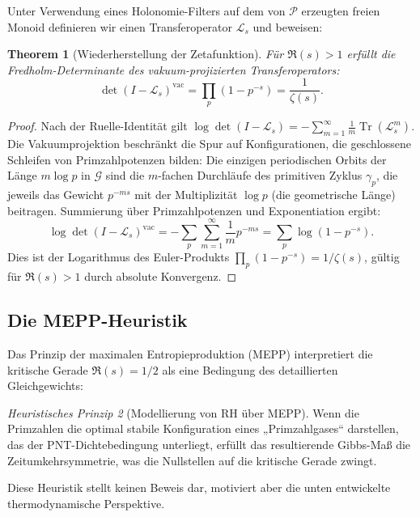 \documentclass[12pt,a4paper]{article}
\newtheorem{theorem}{Theorem}[section]
\theoremstyle{definition}
\theoremstyle{remark}
\newtheorem{heuristic}[theorem]{Heuristisches Prinzip}
\newcommand{\PP}{\mathcal{P}}
\begin{document}
Unter Verwendung eines Holonomie-Filters auf dem von $\PP$ erzeugten freien Monoid definieren wir einen Transferoperator $\mathcal{L}_s$ und beweisen:

\begin{theorem}[Wiederherstellung der Zetafunktion]
\label{thm:vacuum-trace}
Für $\Re(s) > 1$ erfüllt die Fredholm-Determinante des vakuum-projizierten Transferoperators:
\[
\det(I - \mathcal{L}_s)^{\mathrm{vac}} = \prod_p (1 - p^{-s}) = \frac{1}{\zeta(s)}.
\]
\end{theorem}

\begin{proof}
Nach der Ruelle-Identität \cite{Ruelle1976} gilt $\log\det(I - \mathcal{L}_s) = -\sum_{m=1}^\infty \frac{1}{m}\operatorname{Tr}(\mathcal{L}_s^m)$. Die Vakuumprojektion beschränkt die Spur auf Konfigurationen, die geschlossene Schleifen von Primzahlpotenzen bilden: Die einzigen periodischen Orbits der Länge $m\log p$ in $\mathcal{G}$ sind die $m$-fachen Durchläufe des primitiven Zyklus $\gamma_p$, die jeweils das Gewicht $p^{-ms}$ mit der Multiplizität $\log p$ (die geometrische Länge) beitragen. Summierung über Primzahlpotenzen und Exponentiation ergibt:
\[
  \log\det(I - \mathcal{L}_s)^{\mathrm{vac}} = -\sum_p \sum_{m=1}^\infty \frac{1}{m} p^{-ms} = \sum_p \log(1 - p^{-s}).
\]
Dies ist der Logarithmus des Euler-Produkts $\prod_p(1-p^{-s}) = 1/\zeta(s)$, gültig für $\Re(s) > 1$ durch absolute Konvergenz.
\end{proof}

\subsection{Die MEPP-Heuristik}

Das Prinzip der maximalen Entropieproduktion (MEPP) interpretiert die kritische Gerade $\Re(s) = 1/2$ als eine Bedingung des detaillierten Gleichgewichts:

\begin{heuristic}[Modellierung von RH über MEPP]
\label{heur:mepp}
Wenn die Primzahlen die optimal stabile Konfiguration eines „Primzahlgases“ darstellen, das der PNT-Dichtebedingung unterliegt, erfüllt das resultierende Gibbs-Maß die Zeitumkehrsymmetrie, was die Nullstellen auf die kritische Gerade zwingt.
\end{heuristic}

Diese Heuristik stellt keinen Beweis dar, motiviert aber die unten entwickelte thermodynamische Perspektive.


\end{document}
